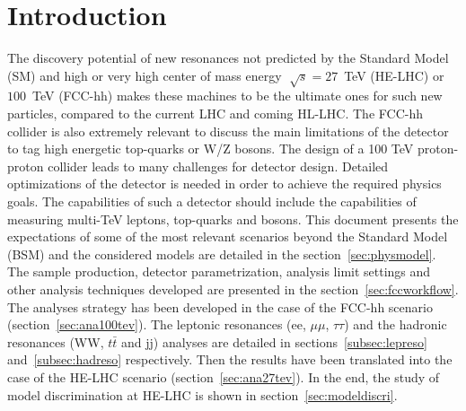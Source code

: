 \section{Introduction}
The discovery potential of new resonances not predicted by the Standard Model (SM) and high or very high center of mass energy $\sqrt[]{s} = 27$~TeV (HE-LHC) or $100$~TeV (FCC-hh)
makes these machines to be the ultimate ones for such new particles, compared to the current LHC and coming HL-LHC.
\newline
The FCC-hh collider is also extremely relevant to discuss the main limitations of the detector to tag high energetic top-quarks or W/Z bosons.
The design of a 100 TeV proton-proton collider leads to many challenges for detector design. Detailed optimizations of the detector is needed in order to achieve the required physics goals.
The capabilities of such a detector should include the capabilities of measuring multi-TeV leptons, top-quarks and bosons.
\newline
\newline
This document presents the expectations of some of the most relevant scenarios beyond the Standard Model (BSM) and the considered models are detailed in the section~\ref{sec:physmodel}.
The sample production, detector parametrization, analysis limit settings and other analysis techniques developed are presented in the section~\ref{sec:fccworkflow}.
\newline
The analyses strategy has been developed in the case of the FCC-hh scenario (section~\ref{sec:ana100tev}).
The leptonic resonances (ee, $\mu\mu$, $\tau\tau$) and the hadronic resonances (WW, $t\bar{t}$ and jj) analyses are detailed in sections~\ref{subsec:lepreso} and~\ref{subsec:hadreso} respectively.
\newline
Then the results have been translated into the case of the HE-LHC scenario (section~\ref{sec:ana27tev}).
\newline
\newline
In the end, the study of model discrimination at HE-LHC is shown in section~\ref{sec:modeldiscri}.


